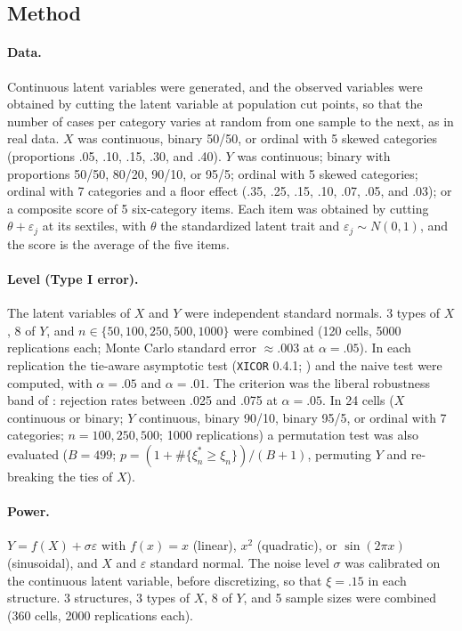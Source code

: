 \documentclass[man,mask,donotrepeattitle,floatsintext]{apa7}
\begin{document}
\subsection{Method}

\paragraph{Data.} Continuous latent variables were generated, and the observed variables were obtained by cutting the latent variable at population cut points, so that the number of cases per category varies at random from one sample to the next, as in real data. $X$ was continuous, binary 50/50, or ordinal with 5 skewed categories (proportions .05, .10, .15, .30, and .40). $Y$ was continuous; binary with proportions 50/50, 80/20, 90/10, or 95/5; ordinal with 5 skewed categories; ordinal with 7 categories and a floor effect (.35, .25, .15, .10, .07, .05, and .03); or a composite score of 5 six-category items. Each item was obtained by cutting $\theta+\varepsilon_j$ at its sextiles, with $\theta$ the standardized latent trait and $\varepsilon_j\sim N(0,1)$, and the score is the average of the five items.

\paragraph{Level (Type I error).} The latent variables of $X$ and $Y$ were independent standard normals. 3 types of $X$, 8 of $Y$, and $n\in\{50,100,250,500,1000\}$ were combined (120 cells, 5000 replications each; Monte Carlo standard error $\approx .003$ at $\alpha=.05$). In each replication the tie-aware asymptotic test (\texttt{XICOR} 0.4.1; \cite{chatterjee2023xicor}) and the naive test were computed, with $\alpha=.05$ and $\alpha=.01$. The criterion was the liberal robustness band of \textcite{bradley1978}: rejection rates between .025 and .075 at $\alpha=.05$. In 24 cells ($X$ continuous or binary; $Y$ continuous, binary 90/10, binary 95/5, or ordinal with 7 categories; $n=100,250,500$; 1000 replications) a permutation test was also evaluated ($B=499$; $p=(1+\#\{\xi_n^*\ge\xi_n\})/(B+1)$, permuting $Y$ and re-breaking the ties of $X$).

\paragraph{Power.} $Y=f(X)+\sigma\varepsilon$ with $f(x)=x$ (linear), $x^2$ (quadratic), or $\sin(2\pi x)$ (sinusoidal), and $X$ and $\varepsilon$ standard normal. The noise level $\sigma$ was calibrated on the continuous latent variable, before discretizing, so that $\xi=.15$ in each structure. 3 structures, 3 types of $X$, 8 of $Y$, and 5 sample sizes were combined (360 cells, 2000 replications each).
\end{document}
